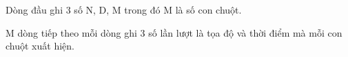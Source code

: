 Dòng đầu ghi 3 số N, D, M trong đó M là số con chuột.  

   M dòng tiếp theo mỗi dòng ghi 3 số lần lượt là tọa độ và thời điểm mà mỗi con chuột xuất hiện.